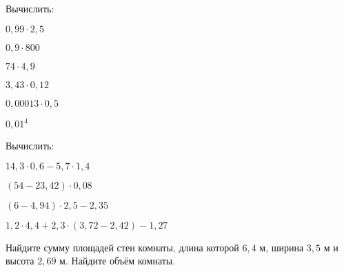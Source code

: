 \begin{class}[type=homework, number=1]
\begin{listofex}
\begin{enumcols}[itemcolumns=2]
		\end{enumcols}
		\item Вычислить:
		\begin{enumcols}[itemcolumns=3]
			\item \( 0,99\cdot2,5 \)
			\item \( 0,9\cdot800 \)
			\item \( 74\cdot4,9 \)
			\item \( 3,43\cdot0,12 \)
			\item \( 0,00013\cdot0,5 \)
			\item \( 0,01^4 \)
		\end{enumcols}
		\item Вычислить:
		\begin{enumcols}[itemcolumns=2]
			\item \( 14,3\cdot0,6-5,7\cdot1,4 \)
			\item \( (54-23,42)\cdot0,08 \)
			\item \( (6-4,94)\cdot2,5-2,35 \)
			\item \( 1,2\cdot4,4+2,3\cdot(3,72-2,42)-1,27 \)
		\end{enumcols}
		\item Найдите сумму площадей стен комнаты, длина которой \( 6,4 \) м, ширина \( 3,5 \) м и
		высота \( 2,69 \) м. Найдите объём комнаты.
	\end{listofex}
\end{class}

